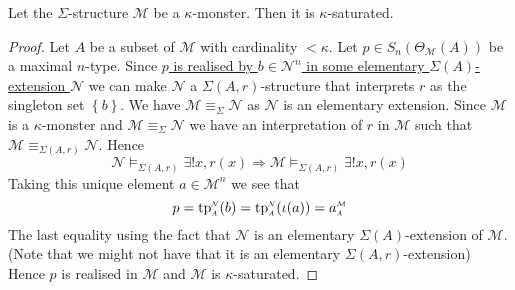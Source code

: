 \documentclass{book}
\renewcommand{\implies}{\Rightarrow}
\newcommand{\set}[1]{\left\{#1\right\}}
\newcommand{\io}{\iota}
\newcommand{\ka}{\kappa}
\newcommand{\Th}{\Theta}
\newcommand{\Si}{\Sigma}
\newcommand{\MM}{\mathcal{M}}
\newcommand{\NN}{\mathcal{N}}
\newcommand{\<}{\langle}
\renewcommand{\>}{\rangle}
\newcommand{\subintp}[3]{
    {#3}_{\text{\scalebox{0.7}{$#1$}}}^{
    \text{\scalebox{0.7}{$#2$}}}}
\newcommand{\model}[1]{\vDash_{#1}}
\DeclareMathOperator{\tp}{tp}
\newcommand{\linkto}[2]{\hyperlink{#1}{#2}}
\theoremstyle{definitionstyle}
\theoremstyle{exercisestyle}
\theoremstyle{remarkstyle}
\begin{document}
\begin{lem}
    Let the $\Si$-structure $\MM$ be a $\ka$-monster.
    Then it is $\ka$-saturated.
\end{lem}
\begin{proof}
    Let $A$ be a subset of $\MM$ with cardinality $< \ka$.
    Let $p \in S_n(\Th_\MM(A))$ be a maximal $n$-type.
    Since \linkto{finite_realisation_and_embeddings}{$p$ 
        is realised by $b \in \NN^n$ in some elementary 
        $\Si(A)$-extension $\NN$}
    we can make $\NN$ a $\Si(A,r)$-structure that interprets 
    $r$ as the singleton set $\set{b}$.
    We have $\MM \equiv_\Si \NN$ as $\NN$ is an elementary extension.
    Since $\MM$ is a $\ka$-monster and $\MM \equiv_\Si \NN$ 
    we have an interpretation of $r$ in $\MM$
    such that $\MM \equiv_{\Si(A,r)} \NN$.
    Hence 
    \[\NN \model{\Si(A,r)} \exists ! x, r(x) \implies 
    \MM \model{\Si(A,r)} \exists ! x, r(x) \]
    Taking this unique element $a \in \MM^n$ we see that 
    \[  
        p = \subintp{A}{\NN}{\tp}(b) = 
        \subintp{A}{\NN}{\tp}(\io(a)) 
        = \subintp{A}{\MM}{a}
    \]
    The last equality using the fact that $\NN$ is an elementary 
    $\Si(A)$-extension of $\MM$. 
    (Note that we might not have that it is an elementary 
    $\Si(A,r)$-extension)
    Hence $p$ is realised in $\MM$ and $\MM$ is $\ka$-saturated.
\end{proof}
\end{document}
